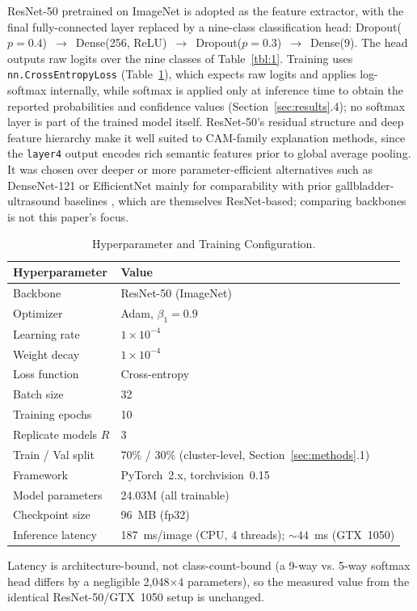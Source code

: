 ResNet-50 \cite{ref27} pretrained on ImageNet \cite{ref30} is adopted as the feature extractor, with the final fully-connected layer replaced by a nine-class classification head: Dropout($p=0.4$)~$\rightarrow$~Dense(256, ReLU)~$\rightarrow$~Dropout($p=0.3$)~$\rightarrow$~Dense(9). The head outputs raw logits over the nine classes of Table~\ref{tbl:1}. Training uses \texttt{nn.CrossEntropyLoss} (Table~\ref{tbl:2}), which expects raw logits and applies log-softmax internally, while softmax is applied only at inference time to obtain the reported probabilities and confidence values (Section~\ref{sec:results}.4); no softmax layer is part of the trained model itself. ResNet-50's residual structure and deep feature hierarchy make it well suited to CAM-family explanation methods, since the \texttt{layer4} output encodes rich semantic features prior to global average pooling. It was chosen over deeper or more parameter-efficient alternatives such as DenseNet-121 \cite{ref28} or EfficientNet \cite{ref29} mainly for comparability with prior gallbladder-ultrasound baselines \cite{ref7}, which are themselves ResNet-based; comparing backbones is not this paper's focus.

\begin{table}[!ht]
\centering
\caption{Hyperparameter and Training Configuration.}
\label{tbl:2}
\begin{tabular}{ll}
\toprule
Hyperparameter & Value \\
\midrule
Backbone & ResNet-50 (ImageNet) \\
Optimizer & Adam, $\beta_1{=}0.9$ \\
Learning rate & $1\times10^{-4}$ \\
Weight decay & $1\times10^{-4}$ \\
Loss function & Cross-entropy \\
Batch size & 32 \\
Training epochs & 10 \\
Replicate models $R$ & 3 \\
Train / Val split & 70\% / 30\% (cluster-level, Section~\ref{sec:methods}.1) \\
Framework & PyTorch~2.x, torchvision~0.15 \\
Model parameters & 24.03M (all trainable) \\
Checkpoint size & 96~MB (fp32) \\
Inference latency & 187~ms/image (CPU, 4 threads); ${\sim}44$~ms (GTX~1050) \\
\bottomrule
\end{tabular}

\vspace{2pt}
\raggedright\footnotesize Latency is architecture-bound, not class-count-bound (a 9-way vs. 5-way softmax head differs by a negligible 2,048$\times$4 parameters), so the measured value from the identical ResNet-50/GTX~1050 setup is unchanged.
\end{table}

